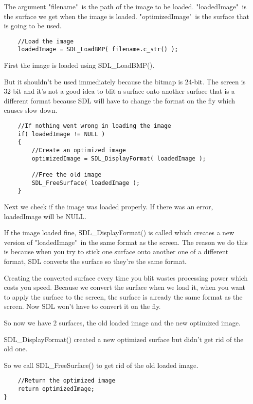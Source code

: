 The argument "filename"\ is the path of the image to be loaded. "loadedImage"\
is the surface we get when the image is loaded. "optimizedImage"\ is the surface
that is going to be used.

\begin{verbatim}
    //Load the image
    loadedImage = SDL_LoadBMP( filename.c_str() );
\end{verbatim}

First the image is loaded using SDL\_LoadBMP().

But it shouldn't be used immediately because the bitmap is 24-bit. The screen is
32-bit and it's not a good idea to blit a surface onto another surface that is a
different format because SDL will have to change the format on the fly which
causes slow down.

\begin{verbatim}
    //If nothing went wrong in loading the image
    if( loadedImage != NULL )
    {
        //Create an optimized image
        optimizedImage = SDL_DisplayFormat( loadedImage );

        //Free the old image
        SDL_FreeSurface( loadedImage );
    }
\end{verbatim}

Next we check if the image was loaded properly. If there was an error,
loadedImage will be NULL.

If the image loaded fine, SDL\_DisplayFormat() is called which creates a new
version of "loadedImage"\ in the same format as the screen. The reason we do
this is because when you try to stick one surface onto another one of a different
format, SDL converts the surface so they're the same format.

Creating the converted surface every time you blit wastes processing power which
costs you speed. Because we convert the surface when we load it, when you want
to apply the surface to the screen, the surface is already the same format as
the screen. Now SDL won't have to convert it on the fly.

So now we have 2 surfaces, the old loaded image and the new optimized image.

SDL\_DisplayFormat() created a new optimized surface but didn't get rid of the
old one.

So we call SDL\_FreeSurface() to get rid of the old loaded image.

\begin{verbatim}
    //Return the optimized image
    return optimizedImage;
}
\end{verbatim}


